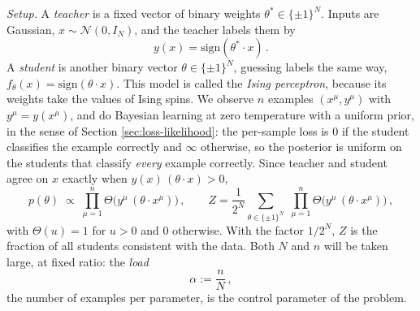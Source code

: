\documentclass[11pt]{article}
\newcommand{\CN}{{\mathcal N}}
\begin{document}
\emph{Setup.} A \emph{teacher} is a fixed vector of binary weights $\theta^*\in\{\pm1\}^N$. Inputs are Gaussian, $x\sim\CN(0,I_N)$, and the teacher labels them by
%
\begin{equation}
    y(x) = \mathrm{sign}(\theta^*\cdot x)\,. \label{perc-teacher}
\end{equation}
%
A \emph{student} is another binary vector $\theta\in\{\pm1\}^N$, guessing labels the same way, $f_\theta(x) = \mathrm{sign}(\theta\cdot x)$. This model is called the \emph{Ising perceptron}, because its weights take the values of Ising spins. We observe $n$ examples $(x^\mu,y^\mu)$ with $y^\mu = y(x^\mu)$, and do Bayesian learning at zero temperature with a uniform prior, in the sense of Section \ref{sec:loss-likelihood}: the per-sample loss is $0$ if the student classifies the example correctly and $\infty$ otherwise, so the posterior is uniform on the students that classify \emph{every} example correctly. Since teacher and student agree on $x$ exactly when $y(x)\,(\theta\cdot x)>0$,
%
\begin{equation}
    p(\theta) \;\propto\; \prod_{\mu=1}^n\Theta\big(y^\mu\,(\theta\cdot x^\mu)\big)\,,\qquad
    Z = \frac{1}{2^N}\sum_{\theta\in\{\pm1\}^N}\;\prod_{\mu=1}^n\Theta\big(y^\mu\,(\theta\cdot x^\mu)\big)\,, \label{perc-Z}
\end{equation}
%
with $\Theta(u) = 1$ for $u>0$ and $0$ otherwise. With the factor $1/2^N$, $Z$ is the fraction of all students consistent with the data. Both $N$ and $n$ will be taken large, at fixed ratio: the \emph{load}
%
\begin{equation}
    \alpha := \frac{n}{N}\,, \label{load}
\end{equation}
%
the number of examples per parameter, is the control parameter of the problem.
\end{document}
